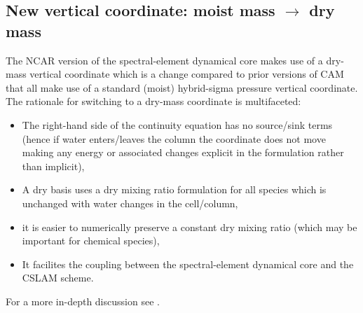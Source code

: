 \documentclass[draft]{agujournal2019}
\begin{document}
\subsection{New vertical coordinate: moist mass $\rightarrow$ dry mass}\label{sec:vertical_coordinate:moistmass}
The NCAR version of the spectral-element dynamical core \cite{LetAl2018JAMES} makes use of a dry-mass vertical coordinate which is a change compared to prior versions of CAM that all make use of a standard (moist) hybrid-sigma pressure vertical coordinate. The rationale for switching to a dry-mass coordinate is multifaceted:
\begin{itemize}
    \item The right-hand side of the continuity equation has no source/sink terms (hence if water enters/leaves the column the coordinate does not move making any energy or associated changes explicit in the formulation rather than implicit),
    \item A dry basis uses a dry mixing ratio formulation for all species which is unchanged with water changes in the cell/column,
    \item it is easier to numerically preserve a constant dry mixing ratio (which may be important for chemical species),
    \item It facilites the coupling between the spectral-element dynamical core and the CSLAM scheme.
\end{itemize}
For a more in-depth discussion see \cite{LetAl2018JAMES}.
\end{document}
